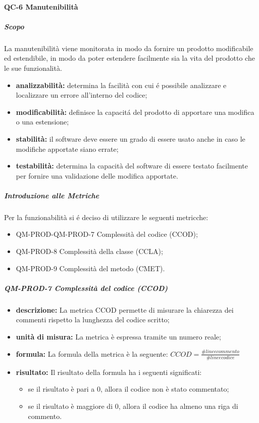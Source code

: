 		\paragraph{QC-6 Manutenibilità}
			\subparagraph{Scopo}
				La manutenibilità viene monitorata in modo da fornire un prodotto modificabile ed estendibile, in modo da poter estendere facilmente sia la vita del prodotto che le sue funzionalità.
				\begin{itemize}
					\item \textbf{analizzabilità:} determina la facilità con cui é possibile analizzare e localizzare un errore all'interno del codice;
					\item \textbf{modificabilità:} definisce la capacitá del prodotto di apportare una modifica o una estensione;
					\item \textbf{stabilità:} il software deve essere un grado di essere usato anche in caso le modifiche apportate siano errate;
					\item \textbf{testabilità:} determina la capacità del software di essere testato facilmente per fornire una validazione delle modifica apportate.
				\end{itemize}
			\subparagraph{Introduzione alle Metriche}
				Per la funzionabilità si é deciso di utilizzare le seguenti metricche:
				\begin{itemize}
					\item QM-PROD-QM-PROD-7 Complessità del codice (CCOD);
					\item QM-PROD-8 Complessità della classe (CCLA);
					\item QM-PROD-9 Complessità del metodo (CMET).
				\end{itemize}
			\subparagraph{QM-PROD-7 Complessità del codice (CCOD)}
			\begin{itemize}
      			\item \textbf{descrizione: }
					La metrica CCOD permette di misurare la chiarezza dei commenti rispetto la lunghezza del codice scritto;
				\item \textbf{unità di misura: }
					La metrica è espressa tramite un numero reale;
				\item \textbf{formula: }
					La formula della metrica è la seguente:
				 \(
				 		CCOD = \frac{\# linee commento}{\# linee codice}
				 \)
				\item \textbf{risultato: }
					Il risultato della formula ha i seguenti significati:
					\begin{itemize}
						\item se il risultato è pari a 0, allora il codice non è stato commentato;
						\item se il risultato è maggiore di 0, allora il codice ha almeno una riga di commento.
					\end{itemize}
			\end{itemize}
